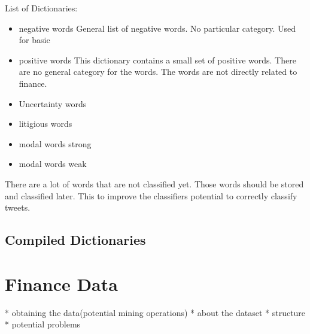List of Dictionaries:
\begin{itemize}
    \item negative words
General list of negative words. No particular category. Used for basic   
    \item positive words
This dictionary contains a small set of positive words. There are no general
category for the words. The words are not directly related to finance. 
    \item Uncertainty words
    \item litigious words
    \item modal words strong
    \item modal words weak
\end{itemize}

There are a lot of words that are not classified yet. Those words should be
stored and classified later. This to improve the classifiers potential to
correctly classify tweets.  

\subsection{Compiled Dictionaries}

\section{Finance Data}
* obtaining the data(potential mining operations)
* about the dataset  
* structure
* potential problems 
